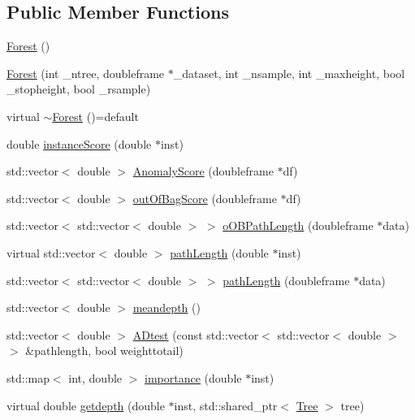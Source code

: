 \subsection*{Public Member Functions}
\begin{DoxyCompactItemize}
\item 
\hyperlink{classForest_af9ad2787ae306cb4da8d7443da124d15}{Forest} ()
\item 
\hyperlink{classForest_ab5be587f4e0768155c39a9bc8484bc57}{Forest} (int \+\_\+ntree, doubleframe $\ast$\+\_\+dataset, int \+\_\+nsample, int \+\_\+maxheight, bool \+\_\+stopheight, bool \+\_\+rsample)
\item 
virtual \hyperlink{classForest_a5ae182b3027fb3be4f1f5c76388ea211}{$\sim$\+Forest} ()=default
\item 
double \hyperlink{classForest_ac88b19d31bc5cc92b429af2716b81325}{instance\+Score} (double $\ast$inst)
\item 
std\+::vector$<$ double $>$ \hyperlink{classForest_a39c34e59ac0088959ce86ddd6bacf9f1}{Anomaly\+Score} (doubleframe $\ast$df)
\item 
std\+::vector$<$ double $>$ \hyperlink{classForest_abc30331242d62253818f72585f757502}{out\+Of\+Bag\+Score} (doubleframe $\ast$df)
\item 
std\+::vector$<$ std\+::vector$<$ double $>$ $>$ \hyperlink{classForest_a2ec4ab1b6cec96a7492a6a8b25a7075d}{o\+O\+B\+Path\+Length} (doubleframe $\ast$data)
\item 
virtual std\+::vector$<$ double $>$ \hyperlink{classForest_a8e3bac70e9f10ce6f301e297e32e8f5a}{path\+Length} (double $\ast$inst)
\item 
std\+::vector$<$ std\+::vector$<$ double $>$ $>$ \hyperlink{classForest_af031c54e9e04b11c21c2b629d6bd0c5c}{path\+Length} (doubleframe $\ast$data)
\item 
std\+::vector$<$ double $>$ \hyperlink{classForest_ac30644f1c7bfc633005875b845e9cd8a}{meandepth} ()
\item 
std\+::vector$<$ double $>$ \hyperlink{classForest_a695e24a0ca4a1a5685f4ab1eb996984c}{A\+Dtest} (const std\+::vector$<$ std\+::vector$<$ double $>$ $>$ \&pathlength, bool weighttotail)
\item 
std\+::map$<$ int, double $>$ \hyperlink{classForest_acb23b1464f1244ad49e178935485384c}{importance} (double $\ast$inst)
\item 
virtual double \hyperlink{classForest_a977abbe81e409465546cef0164b5b439}{getdepth} (double $\ast$inst, std\+::shared\+\_\+ptr$<$ \hyperlink{classTree}{Tree} $>$ tree)
\item 

\end{DoxyCompactItemize}
